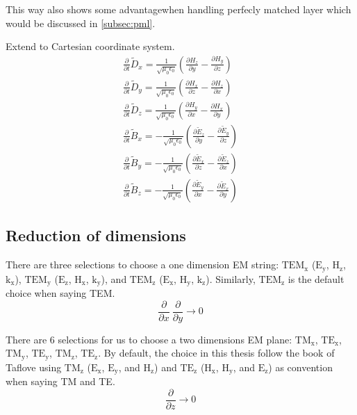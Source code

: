This way also shows some advantagewhen handling perfecly matched layer which would be discussed in \ref{subsec:pml}.

Extend to Cartesian coordinate system.
\begin{gather}
  \frac{\partial}{\partial t}\widetilde{D}_x = \frac{1}{\sqrt{\mu_0\epsilon_0}}\left(\frac{\partial H_z}{\partial y} - \frac{\partial H_y}{\partial z}\right)\\
  \frac{\partial}{\partial t}\widetilde{D}_y = \frac{1}{\sqrt{\mu_0\epsilon_0}}\left(\frac{\partial H_x}{\partial z} - \frac{\partial H_z}{\partial x}\right)\\
  \frac{\partial}{\partial t}\widetilde{D}_z = \frac{1}{\sqrt{\mu_0\epsilon_0}}\left(\frac{\partial H_y}{\partial x} - \frac{\partial H_x}{\partial y}\right)\\
  \frac{\partial}{\partial t}\widetilde{B}_x =-\frac{1}{\sqrt{\mu_0\epsilon_0}}\left(\frac{\partial \widetilde{E}_z}{\partial y} - \frac{\partial \widetilde{E}_y}{\partial z}\right)\\
  \frac{\partial}{\partial t}\widetilde{B}_y =-\frac{1}{\sqrt{\mu_0\epsilon_0}}\left(\frac{\partial \widetilde{E}_x}{\partial z} - \frac{\partial \widetilde{E}_z}{\partial x}\right)\\
  \frac{\partial}{\partial t}\widetilde{B}_z =-\frac{1}{\sqrt{\mu_0\epsilon_0}}\left(\frac{\partial \widetilde{E}_y}{\partial x} - \frac{\partial \widetilde{E}_x}{\partial y}\right)
\end{gather}

\subsection{Reduction of dimensions}
There are three selections to choose a one dimension EM string: $\mathrm{TEM_x}$ ($\mathrm{E_{y}}$, $\mathrm{H_{z}}$,
$\mathrm{k_x}$), $\mathrm{TEM_y}$ ($\mathrm{E_z}$, $\mathrm{H_x}$, $\mathrm{k_y}$), and $\mathrm{TEM_z}$
($\mathrm{E_x}$, $\mathrm{H_y}$, $\mathrm{k_z}$). Similarly, $\mathrm{TEM_z}$ is the default choice when saying TEM.
\begin{displaymath}
  \frac{\partial}{\partial x}\ \frac{\partial}{\partial y} \rightarrow 0
\end{displaymath}

There are 6 selections for us to choose a two dimensions EM plane: $\mathrm{TM_{x}} $, $\mathrm{TE_{x}}$,
$\mathrm{TM_{y}}$, $\mathrm{TE_{y}}$, $\mathrm{TM_{z}}$, $\mathrm{TE_{z}}$. By default, the choice in this thesis follow
the book of Taflove using $\mathrm{TM_{z}}$ ($\mathrm{E_x}$, $\mathrm{E_y}$, and $\mathrm{H_z}$) and $\mathrm{TE_{z}}$
($\mathrm{H_x}$, $\mathrm{H_y}$, and $\mathrm{E_z}$) as convention when saying TM and TE.
\begin{displaymath}
  \frac{\partial}{\partial z} \rightarrow 0
\end{displaymath}



